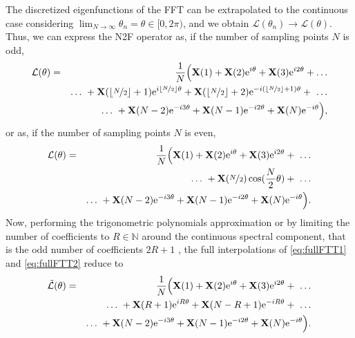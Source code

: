 \par The discretized eigenfunctions of the FFT can be extrapolated to the continuous case considering $\displaystyle \lim_{N\to\infty} \theta_n = \theta \in [0,2\pi)$, and we obtain $ \displaystyle \mathcal{L}(\theta_n) \to \mathcal{L}(\theta)$.  Thus, we can express the N2F operator as, if the number of sampling points $N$ is odd,
\begin{eqnarray}
\label{eq:fullFTT1}
\mathcal{L}(\theta) &= &\frac{1}{N} \Big ( \mathbf{X}(1) + \mathbf{X}(2) \mathrm{e}^{i \theta} + \mathbf{X}(3) \mathrm{e}^{i 2 \theta} + \ldots \nonumber \\
& & \ldots \  + \mathbf{X}(\lfloor\nicefrac{N}{2}\rfloor+1) \mathrm{e}^{i \lfloor\nicefrac{N}{2}\rfloor \theta}  +  \mathbf{X}(\lfloor\nicefrac{N}{2}\rfloor+2) \mathrm{e}^{ -i (\lfloor\nicefrac{N}{2}\rfloor+1) \theta} + \ \ldots \nonumber \\
& & \ldots \ + \mathbf{X}(N-2) \mathrm{e}^{-i 3 \theta} + \mathbf{X}(N-1) \mathrm{e}^{-i 2 \theta} + \mathbf{X}(N) \mathrm{e}^{- i \theta} \Big ),
\end{eqnarray} or as, if the number of sampling points $N$ is even,
\begin{eqnarray}
\label{eq:fullFTT2}
\mathcal{L}(\theta) &= &\frac{1}{N} \Big ( \mat{X}(1) + \mat{X}(2) \mrm{e}^{i \theta} + \mat{X}(3) \mrm{e}^{i 2 \theta} + \ \ldots \nonumber \\
& & \ldots \ + \mat{X}(\nicefrac{N}{2}) \cos(\frac{N}{2} \theta) + \ \ldots \nonumber \\
& & \ldots \ + \mat{X}(N-2) \mrm{e}^{-i 3 \theta} + \mat{X}(N-1) \mrm{e}^{-i 2 \theta} + \mat{X}(N) \mrm{e}^{- i \theta} \Big ).
\end{eqnarray}
Now, performing the trigonometric polynomials approximation or  by limiting the number of coefficients to $R \in \mathbb{N}$ around the continuous spectral component, that is the odd number of coefficients $2R+1$ , the full interpolations of \eqref{eq:fullFTT1} and \eqref{eq:fullFTT2} reduce to
\begin{eqnarray}
\label{eq:DFTtrunc}
\tilde{\mathcal{L}}(\theta) & = &\frac{1}{N} \Big ( \mat{X}(1) + \mat{X}(2) \mrm{e}^{i \theta} + \mat{X}(3) \mrm{e}^{i 2 \theta} + \ \ldots \nonumber \\
& &  \ldots \ + \mat{X}(R+1) \mrm{e}^{i R \theta}  +  \mat{X}(N-R+1) \mrm{e}^{ -i R \theta} + \ \ldots \nonumber \\
& &  \ldots \ + \mat{X}(N-2) \mrm{e}^{-i 3 \theta} + \mat{X}(N-1) \mrm{e}^{-i 2 \theta} + \mat{X}(N) \mrm{e}^{- i \theta} \Big ).
\end{eqnarray}

